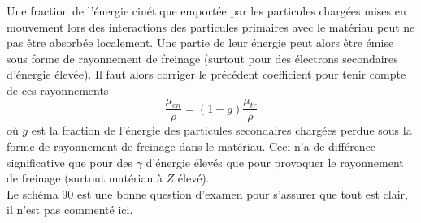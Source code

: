 Une fraction de l'énergie cinétique emportée par les particules chargées mises en mouvement lors des
interactions des particules primaires avec le matériau peut ne pas être absorbée localement. Une
partie de leur énergie peut alors être émise sous forme de rayonnement de freinage (surtout pour des 
électrons secondaires d'énergie élevée). Il faut alors corriger le précédent coefficient pour tenir
compte de ces rayonnements
\begin{equation}
 \frac{\mu_{en}}{\rho}=(1-g)\frac{\mu_{tr}}{\rho}
\end{equation}
où $g$ est la fraction de l'énergie des particules secondaires chargées perdue sous la forme de 
rayonnement de freinage dans le matériau. Ceci n'a de différence significative que pour des 
$\gamma$ d'énergie élevés que pour provoquer le rayonnement de freinage (surtout matériau à $Z$ 
élevé).\\

Le schéma 90 est une bonne question d'examen pour s'assurer que tout est clair, il n'est pas
commenté ici.